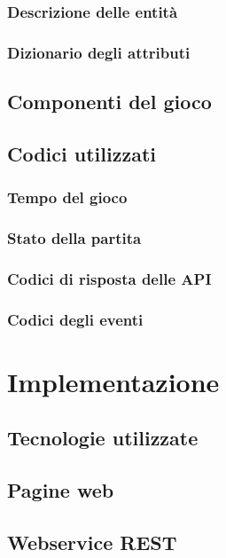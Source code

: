 \documentclass[b5paper,10pt,twoside,cucitura]{toptesi}
\begin{document}
\subsection{Descrizione delle entità}
\subsection{Dizionario degli attributi}

\section{Componenti del gioco}

\section{Codici utilizzati}
\subsection{Tempo del gioco}
\subsection{Stato della partita}
\subsection{Codici di risposta delle API}
\subsection{Codici degli eventi}

\chapter{Implementazione}

\section{Tecnologie utilizzate}
\section{Pagine web}
\section{Webservice REST}

\end{document}
